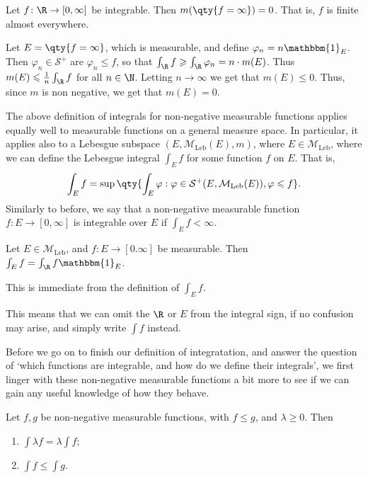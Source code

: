 \documentclass{maths}
\newcommand{\mleb}{\mathcal{M}_{\text{Leb}}}
\newcommand{\smpl}{\mathcal{S}}
\newcommand{\ind}{\mathbbm{1}}
\begin{document}
\begin{prop}
    Let $f\colon\R\to[0,\infty]$ be integrable.
    Then $m(\qty{f=\infty})=0$.
    That is, $f$ is finite almost everywhere.
\end{prop}

\begin{prf}
    Let $E=\qty{f=\infty}$, which is measurable, and define $\varphi_n = n\ind_{E}$.
    Then $\varphi_n\in\smpl^+$ are $\varphi_n\leqslant f$, so that $\int_{\R}f\geqslant\int_{\R}\varphi_n = n\cdot m(E)$.
    Thus $m(E)\leqslant\frac{1}{n}\int_{\R} f$ for all $n\in\N$.
    Letting $n\to\infty$ we get that $m(E)\leqslant0$.
    Thus, since $m$ is non negative, we get that $m(E)=0$.
\end{prf}

The above definition of integrals for non-negative measurable functions applies equally well to measurable functions on a general measure space.
In particular, it applies also to a Lebesgue subspace $(E,\mleb(E),m)$, where $E\in\mleb$, where we can define the Lebesgue integral $\int_E f$ for some function $f$ on $E$.
That is,
\[
    \int_E f =
    \sup\qty{\int_E \varphi : \varphi\in\smpl^+(E,\mleb(E)), \varphi\leqslant f}.
\]
Similarly to before, we say that a non-negative measurable function $f\colon E\to[0,\infty]$ is integrable over $E$ if $\int_E f<\infty$.

\begin{prop}
    Let $E\in\mleb$, and $f\colon E\to[0.\infty]$ be measurable.
    Then $\int_E f = \int_{\R} f\ind_E$.
\end{prop}

\begin{prf}
    This is immediate from the definition of $\int_E f$.
\end{prf}

This means that we can omit the $\R$ or $E$ from the integral sign, if no confusion may arise, and simply write $\int f$ instead.

Before we go on to finish our definition of integratation, and answer the question of `which functions are integrable, and how do we define their integrals', we first linger with these non-negative measurable functions a bit more to see if we can gain any useful knowledge of how they behave.

\begin{prop}
    Let $f,g$ be non-negative measurable functions, with $f\leqslant g$, and $\lambda\geqslant0$.
    Then
    \begin{enumerate}
        \item $\int\lambda f = \lambda\int f$;
        \item $\int f\leqslant \int g$.
    \end{enumerate}
\end{prop}
\end{document}
